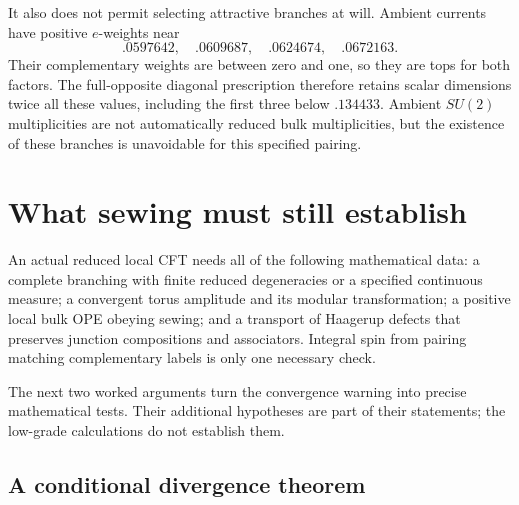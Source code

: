 It also does not permit selecting attractive branches at will.
Ambient currents have positive $e$-weights near
\[
 .0597642,\quad .0609687,\quad .0624674,\quad .0672163.
\]
Their complementary weights are between zero and one, so they are
tops for both factors. The full-opposite diagonal prescription
therefore retains scalar dimensions twice all these values, including
the first three below $.134433$. Ambient $SU(2)$ multiplicities are
not automatically reduced bulk multiplicities, but the existence of
these branches is unavoidable for this specified pairing.

\section{What sewing must still establish}

An actual reduced local CFT needs all of the following mathematical
data: a complete branching with finite reduced degeneracies or a
specified continuous measure; a convergent torus amplitude and its
modular transformation; a positive local bulk OPE obeying sewing; and
a transport of Haagerup defects that preserves junction compositions
and associators. Integral spin from pairing matching complementary
labels is only one necessary check.

The next two worked arguments turn the convergence warning into
precise mathematical tests. Their additional hypotheses are part of
their statements; the low-grade calculations do not establish them.

\subsection{A conditional divergence theorem}

